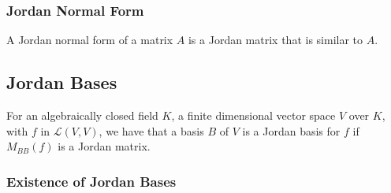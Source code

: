 \subsubsection{Jordan Normal Form}

A Jordan normal form of a matrix $A$ is a Jordan matrix that is similar to $A$.

\subsection{Jordan Bases}

For an algebraically closed field $K$, a finite dimensional vector space $V$ over
$K$, with $f$ in $\mathcal{L}(V, V)$, we have that a basis $B$ of $V$ is a 
Jordan basis for $f$ if $M_{BB}(f)$ is a Jordan matrix.

\subsubsection{Existence of Jordan Bases}

